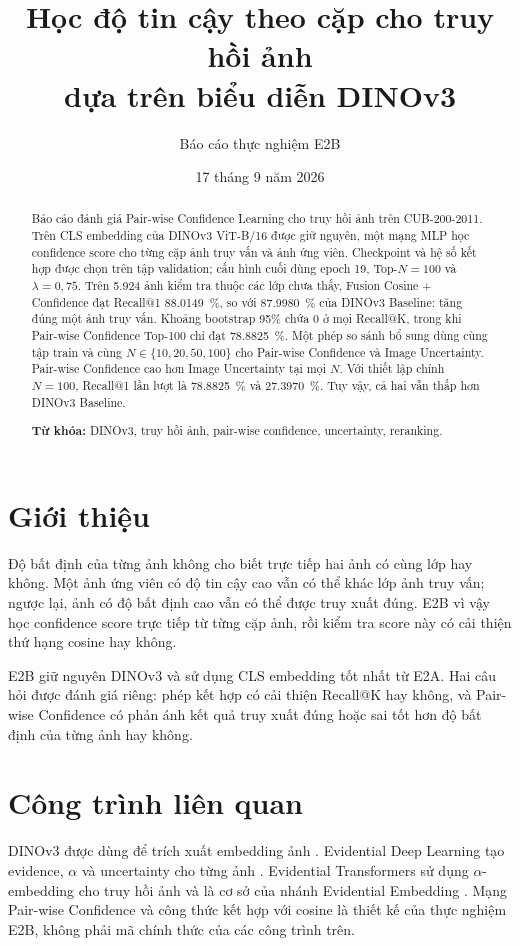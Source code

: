 \documentclass[11pt,a4paper]{article}
\title{\bfseries\LARGE Học độ tin cậy theo cặp cho truy hồi ảnh\\[0.3em]
dựa trên biểu diễn DINOv3}
\author{Báo cáo thực nghiệm E2B}
\date{17 tháng 9 năm 2026}
\begin{document}
\maketitle
\thispagestyle{plain}

\begin{abstract}
Báo cáo đánh giá Pair-wise Confidence Learning cho truy hồi ảnh trên
CUB-200-2011. Trên CLS embedding của DINOv3 ViT-B/16 được giữ nguyên,
một mạng MLP học confidence score cho từng cặp ảnh truy vấn và ảnh ứng viên.
Checkpoint và hệ số kết hợp được chọn trên tập validation; cấu hình cuối dùng
epoch 19, Top-$N=100$ và $\lambda=0{,}75$.
Trên 5.924 ảnh kiểm tra thuộc các lớp chưa thấy, Fusion Cosine + Confidence
đạt Recall@1 \SI{88.0149}{\percent}, so với \SI{87.9980}{\percent} của
DINOv3 Baseline: tăng đúng một ảnh truy vấn. Khoảng bootstrap 95\% chứa 0 ở mọi
Recall@K, trong khi Pair-wise Confidence Top-100 chỉ đạt
\SI{78.8825}{\percent}. Một phép so sánh bổ sung dùng cùng tập train và cùng
$N\in\{10,20,50,100\}$ cho Pair-wise Confidence và Image Uncertainty.
Pair-wise Confidence cao hơn Image Uncertainty tại mọi $N$. Với thiết lập
chính $N=100$, Recall@1 lần lượt là \SI{78.8825}{\percent} và
\SI{27.3970}{\percent}. Tuy vậy, cả hai vẫn thấp hơn DINOv3 Baseline.

\noindent\textbf{Từ khóa:} DINOv3, truy hồi ảnh, pair-wise confidence,
uncertainty, reranking.
\end{abstract}

\section{Giới thiệu}
Độ bất định của từng ảnh không cho biết trực tiếp hai ảnh có cùng lớp hay
không. Một ảnh ứng viên có độ tin cậy cao vẫn có thể khác lớp ảnh truy vấn;
ngược lại, ảnh có độ bất định cao vẫn có thể được truy xuất đúng. E2B vì vậy
học confidence score trực tiếp từ từng cặp ảnh, rồi kiểm tra score này có cải
thiện thứ hạng cosine hay không.

E2B giữ nguyên DINOv3 và sử dụng CLS embedding tốt nhất từ E2A. Hai câu hỏi
được đánh giá riêng: phép kết hợp có cải thiện Recall@K hay không, và
Pair-wise Confidence có phản ánh kết quả truy xuất đúng hoặc sai tốt hơn độ
bất định của từng ảnh hay không.

\section{Công trình liên quan}
DINOv3 được dùng để trích xuất embedding ảnh \cite{simeoni2025dinov3}.
Evidential Deep Learning tạo evidence, $\alpha$ và uncertainty cho từng ảnh
\cite{sensoy2018edl}. Evidential Transformers sử dụng $\alpha$-embedding cho
truy hồi ảnh và là cơ sở của nhánh Evidential Embedding
\cite{dordevic2024evidential}. Mạng Pair-wise Confidence và công thức kết hợp
với cosine là thiết kế của thực nghiệm E2B, không phải mã chính thức của các
công trình trên.
\end{document}
